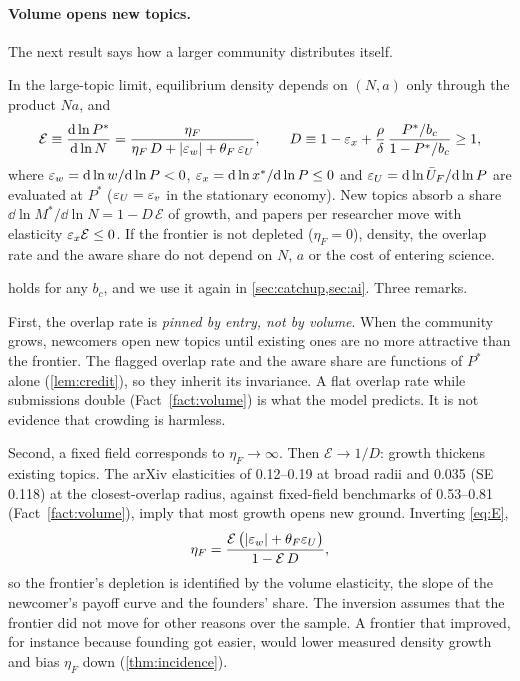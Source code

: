 \paragraph{Volume opens new topics.} The next result says how a larger
community distributes itself.

\begin{proposition}\label{prop:volume}
In the large-topic limit, equilibrium density depends on $(N,a)$ only through
the product $N a$, and
\begin{equation}\label{eq:E}
\mathcal E\equiv\frac{\mathrm{d}\ln P^*}{\mathrm{d}\ln N}=\frac{\eta_F}{\eta_F\,D+|\varepsilon_w|+\theta_F\,\varepsilon_U},\qquad D\equiv1-\varepsilon_x+\frac{\rho}{\delta}\,\frac{P^*/b_c}{1-P^*/b_c}\ge 1,
\end{equation}
where $\varepsilon_w=\mathrm{d}\ln w/\mathrm{d}\ln P<0$, $\varepsilon_x=\mathrm{d}\ln x^*/\mathrm{d}\ln P\le 0$ and
$\varepsilon_U=\mathrm{d}\ln\bar U_F/\mathrm{d}\ln P$ are evaluated at $P^*$ ($\varepsilon_U=\varepsilon_v$ in the
stationary economy). New topics absorb a share $\dd\ln M^*/\dd\ln N=1-D\,\mathcal E$
of growth, and papers per researcher move with elasticity $\varepsilon_x\mathcal E\le 0$.
If the frontier is not depleted ($\eta_F=0$), density, the overlap rate and the
aware share do not depend on $N$, $a$ or the cost of entering science.
\end{proposition}

 holds for any $b_c$, and we use it again in
\cref{sec:catchup,sec:ai}. Three remarks.

First, the overlap rate is \emph{pinned by entry, not by volume}. When the
community grows, newcomers open new topics until existing ones are no more
attractive than the frontier. The flagged overlap rate and the aware share are
functions of $P^*$ alone (\cref{lem:credit}), so they inherit its invariance. A
flat overlap rate while submissions double (Fact~\ref{fact:volume}) is what the
model predicts. It is not evidence that crowding is harmless.

Second, a fixed field corresponds to $\eta_F\to\infty$. Then $\mathcal E\to1/D$:
growth thickens existing topics. The arXiv elasticities of 0.12--0.19 at broad
radii and 0.035 (SE 0.118) at the closest-overlap radius, against fixed-field
benchmarks of 0.53--0.81 (Fact~\ref{fact:volume}), imply that most growth opens
new ground. Inverting \eqref{eq:E},
\begin{equation}\label{eq:eta}
\eta_F=\frac{\mathcal E\,\big(|\varepsilon_w|+\theta_F\varepsilon_U\big)}{1-\mathcal E\,D},
\end{equation}
so the frontier's depletion is identified by the volume elasticity, the slope
of the newcomer's payoff curve and the founders' share. The inversion assumes
that the frontier did not move for other reasons over the sample. A frontier
that improved, for instance because founding got easier, would lower measured
density growth and bias $\eta_F$ down (\cref{thm:incidence}).

